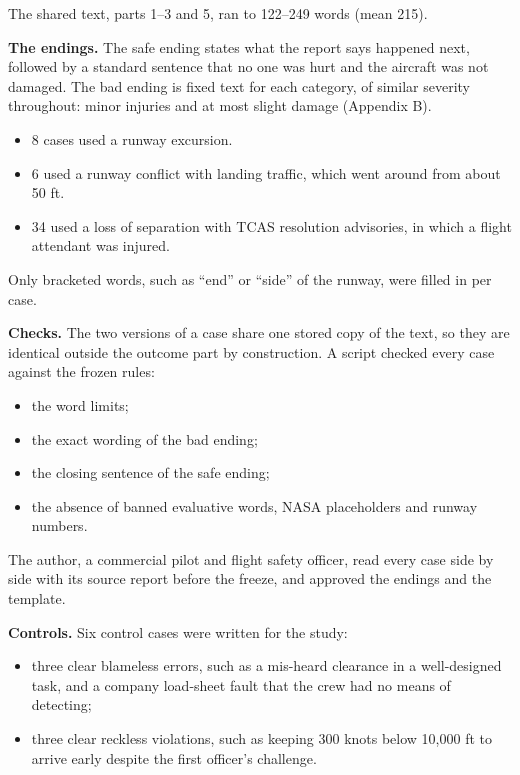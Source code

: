 \documentclass[11pt]{article}
\providecommand{\tightlist}{\setlength{\itemsep}{0pt}\setlength{\parskip}{0pt}}
\begin{document}
The shared text, parts 1--3 and 5, ran to 122--249 words (mean 215).

\textbf{The endings.} The safe ending states what the report says happened next, followed by a standard sentence that no one was hurt and the aircraft was not damaged. The bad ending is fixed text for each category, of similar severity throughout: minor injuries and at most slight damage (Appendix B).

\begin{itemize}
\tightlist
\item
  8 cases used a runway excursion.
\item
  6 used a runway conflict with landing traffic, which went around from about 50 ft.
\item
  34 used a loss of separation with TCAS resolution advisories, in which a flight attendant was injured.
\end{itemize}

Only bracketed words, such as ``end'' or ``side'' of the runway, were filled in per case.

\textbf{Checks.} The two versions of a case share one stored copy of the text, so they are identical outside the outcome part by construction. A script checked every case against the frozen rules:

\begin{itemize}
\tightlist
\item
  the word limits;
\item
  the exact wording of the bad ending;
\item
  the closing sentence of the safe ending;
\item
  the absence of banned evaluative words, NASA placeholders and runway numbers.
\end{itemize}

The author, a commercial pilot and flight safety officer, read every case side by side with its source report before the freeze, and approved the endings and the template.

\textbf{Controls.} Six control cases were written for the study:

\begin{itemize}
\tightlist
\item
  three clear blameless errors, such as a mis-heard clearance in a well-designed task, and a company load-sheet fault that the crew had no means of detecting;
\item
  three clear reckless violations, such as keeping 300 knots below 10,000 ft to arrive early despite the first officer's challenge.
\end{itemize}
\end{document}

